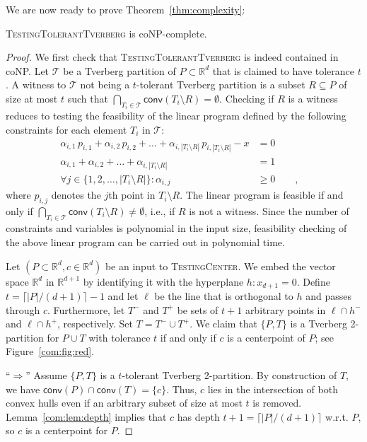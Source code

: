 \documentclass[oribibl,envcountsame,envcountsect]{llncs}
\newcommand{\mc}[1]{\ensuremath{\mathcal{#1}}}
\newcommand{\conv}{\mathsf{conv}}
\newcommand{\real}{\mathbb{R}}
\begin{document}
We are now ready to prove Theorem~\ref{thm:complexity}:
\begin{theorem}
  \textsc{TestingTolerantTverberg} is coNP-complete.
\end{theorem}
\begin{proof}
  We first check that \textsc{TestingTolerantTverberg} is indeed contained in
  coNP. Let $\mathcal{T}$ be a Tverberg partition of $P\subset
  \real^d$ that is claimed to have tolerance $t$. A witness to
  $\mathcal{T}$ not being a $t$-tolerant Tverberg partition is a subset
  $R\subseteq P$ of size at most $t$ such that
  $\bigcap_{T_i\in\mathcal{T}}\conv(T_i \setminus R) = \emptyset$. Checking if
  $R$ is a witness reduces to testing the feasibility  of the linear
  program defined by the following constraints for each element
  $T_i$ in \mc{T}:
  \begin{align*}
    \alpha_{i,1}\, p_{i,1} + \alpha_{i,2}\, p_{i,2} + \dots + \alpha_{i,|T_i
      \setminus R|}\, p_{i, |T_i \setminus R|} - x & = 0 \\
    \alpha_{i,1}+ \alpha_{i,2}+ \dots + \alpha_{i,|T_i\setminus R|} & = 1 \\
    \forall j \in \{1,2,\ldots,|T_i \setminus R|\}: \alpha_{i,j} & \geq 0 \qquad, &
  \end{align*}
  where $p_{i,j}$ denotes the $j$th point in $T_i \setminus R$.
  The linear program is feasible if and only if $\bigcap_{T_i\in\mc{T}}
  \conv(T_i \setminus R) \neq \emptyset$, i.e., if $R$ is not a witness.
  Since the number of constraints and variables is polynomial in the input size,
  feasibility checking of the above linear program can be carried out in
  polynomial time.

  Let $(P\subset\real^{d}, c\in\real^{d})$ be an input to
  \textsc{TestingCenter}. We embed the vector space $\real^{d}$ in $\real^{d+1}$
  by identifying it with the hyperplane $h: x_{d+1} = 0$.  Define $t=\lceil |P|
  / (d+1) \rceil -1$ and let $\ell$ be the line that is orthogonal to $h$ and
  passes through $c$. Furthermore, let $T^-$ and $T^+$ be sets of $t+1$
  arbitrary points in $\ell\cap h^-$ and $\ell\cap h^+$, respectively.  Set $T =
  T^- \cup T^+$. We claim that $\{P, T\}$ is a Tverberg 2-partition for $P\cup
  T$ with tolerance $t$ if and only if $c$ is a centerpoint of $P$; see
  Figure~\ref{com:fig:red}.

  ``$\Rightarrow$'' Assume $\{P, T\}$ is a $t$-tolerant Tverberg
    2-partition. By construction of $T$, we have $\conv(P) \cap \conv(T)  = \{c\}$.
    Thus, $c$ lies in the intersection
    of both convex hulls even if an arbitrary subset of size at most $t$ is removed.
    Lemma~\ref{com:lem:depth} implies that $c$ has depth $t+1  = \lceil |P| / (d+1)
    \rceil$ w.r.t. $P$, so $c$ is a centerpoint for $P$.


\end{proof}
\end{document}
